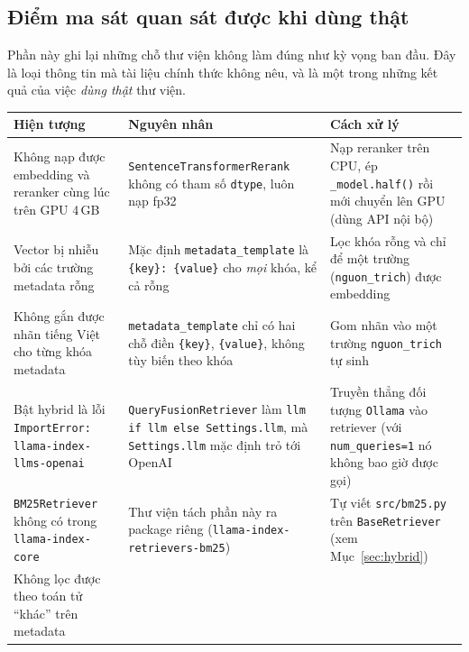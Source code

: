 
\subsection{Điểm ma sát quan sát được khi dùng thật}
\label{sec:ma-sat}

Phần này ghi lại những chỗ thư viện không làm đúng như kỳ vọng ban đầu. Đây là loại thông tin
mà tài liệu chính thức không nêu, và là một trong những kết quả của việc \emph{dùng thật} thư viện.

\begin{table}[H]
  \centering
  \small
  \begin{tabularx}{\textwidth}{>{\hsize=1.05\hsize}X >{\hsize=1.05\hsize}X >{\hsize=0.9\hsize}X}
    \toprule
    \textbf{Hiện tượng} & \textbf{Nguyên nhân} & \textbf{Cách xử lý} \\
    \midrule
    Không nạp được embedding và reranker cùng lúc trên GPU 4\,GB &
      \texttt{SentenceTransformerRerank} không có tham số \texttt{dtype}, luôn nạp fp32 &
      Nạp reranker trên CPU, ép \texttt{\_model.half()} rồi mới chuyển lên GPU (dùng API nội bộ) \\
    Vector bị nhiễu bởi các trường metadata rỗng &
      Mặc định \texttt{metadata\_template} là \texttt{\{key\}: \{value\}} cho \emph{mọi} khóa, kể cả rỗng &
      Lọc khóa rỗng và chỉ để một trường (\texttt{nguon\_trich}) được embedding \\
    Không gắn được nhãn tiếng Việt cho từng khóa metadata &
      \texttt{metadata\_template} chỉ có hai chỗ điền \texttt{\{key\}}, \texttt{\{value\}}, không tùy biến theo khóa &
      Gom nhãn vào một trường \texttt{nguon\_trich} tự sinh \\
    Bật hybrid là lỗi \texttt{ImportError: llama-index-llms-openai} &
      \texttt{QueryFusionRetriever} làm \texttt{llm if llm else Settings.llm}, mà \texttt{Settings.llm} mặc định trỏ tới OpenAI &
      Truyền thẳng đối tượng \texttt{Ollama} vào retriever (với \texttt{num\_queries=1} nó không bao giờ được gọi) \\
    \texttt{BM25Retriever} không có trong \texttt{llama-index-core} &
      Thư viện tách phần này ra package riêng (\texttt{llama-index-retrievers-bm25}) &
      Tự viết \texttt{src/bm25.py} trên \texttt{BaseRetriever} (xem Mục~\ref{sec:hybrid}) \\
    Không lọc được theo toán tử ``khác'' trên metadata &

\end{tabularx}
\end{table}

